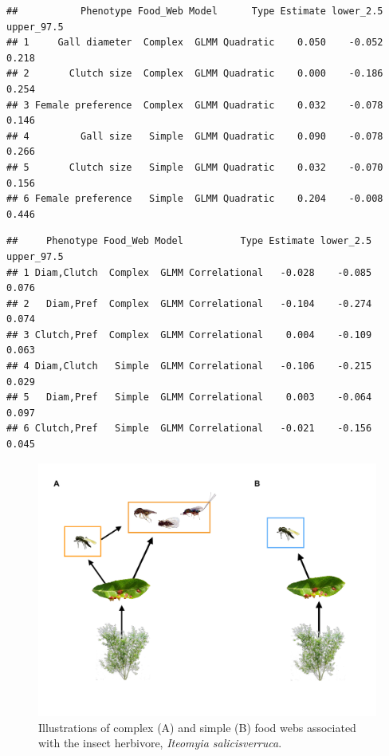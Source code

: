 \documentclass[]{elsarticle} %
\makeatletter
\def\maxwidth{\ifdim\Gin@nat@width>\linewidth\linewidth
\else\Gin@nat@width\fi}
\let\Oldincludegraphics\includegraphics
\renewcommand{\includegraphics}[1]{\Oldincludegraphics[width=\maxwidth]{#1}}
\makeatother
\begin{document}
\begin{verbatim}
##           Phenotype Food_Web Model      Type Estimate lower_2.5 upper_97.5
## 1     Gall diameter  Complex  GLMM Quadratic    0.050    -0.052      0.218
## 2       Clutch size  Complex  GLMM Quadratic    0.000    -0.186      0.254
## 3 Female preference  Complex  GLMM Quadratic    0.032    -0.078      0.146
## 4         Gall size   Simple  GLMM Quadratic    0.090    -0.078      0.266
## 5       Clutch size   Simple  GLMM Quadratic    0.032    -0.070      0.156
## 6 Female preference   Simple  GLMM Quadratic    0.204    -0.008      0.446
\end{verbatim}

\begin{verbatim}
##     Phenotype Food_Web Model          Type Estimate lower_2.5 upper_97.5
## 1 Diam,Clutch  Complex  GLMM Correlational   -0.028    -0.085      0.076
## 2   Diam,Pref  Complex  GLMM Correlational   -0.104    -0.274      0.074
## 3 Clutch,Pref  Complex  GLMM Correlational    0.004    -0.109      0.063
## 4 Diam,Clutch   Simple  GLMM Correlational   -0.106    -0.215      0.029
## 5   Diam,Pref   Simple  GLMM Correlational    0.003    -0.064      0.097
## 6 Clutch,Pref   Simple  GLMM Correlational   -0.021    -0.156      0.045
\end{verbatim}

\begin{figure}[htbp]
\centering
\includegraphics{complex_simple_foodwebs_compressed.pdf}
\caption{Illustrations of complex (A) and simple (B) food webs
associated with the insect herbivore, \emph{Iteomyia salicisverruca}.}
\end{figure}
\end{document}
